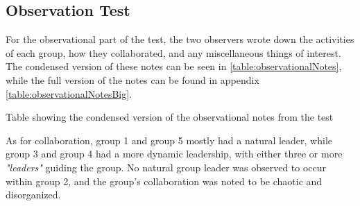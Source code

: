 \subsection{Observation Test}
For the observational part of the test, the two observers wrote down the activities of each group, how they collaborated, and any miscellaneous things of interest. The condensed version of these notes can be seen in \autoref{table:observationalNotes}, while the full version of the notes can be found in appendix \autoref{table:observationalNotesBig}. 
\begin{table}[H]
\centering
\caption{Table showing the condensed version of the observational notes from the test}
\label{table:observationalNotes}

\end{table}
As for collaboration, group 1 and group 5 mostly had a natural leader, while group 3 and group 4 had a more dynamic leadership, with either three or more \textit{"leaders"} guiding the group. No natural group leader was observed to occur within group 2, and the group's collaboration was noted to be chaotic and disorganized.